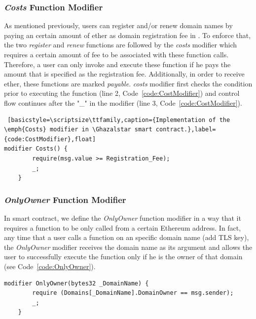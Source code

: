 \subsubsection*{\emph{Costs} Function Modifier}

As mentioned previously, users can register and/or renew domain names by paying an certain amount of ether as domain registration fee in \Ghazalstar. To enforce that, the two \emph{register} and \emph{renew} functions are followed by the \emph{costs} modifier which requires a certain amount of fee to be associated with these function calls. Therefore, a user can only invoke and execute these function if he pays the amount that is specified as the registration fee. Additionally, in order to receive ether, these functions are marked \emph{payable}. \emph{costs} modifier first checks the condition prior to executing the function (line 2, Code~\ref{code:CostModifier}) and control flow continues after the "\_" in the modifier (line 3, Code~\ref{code:CostModifier}).

\begin{lstlisting} [basicstyle=\scriptsize\ttfamily,caption={Implementation of the \emph{Costs} modifier in \Ghazalstar smart contract.},label={code:CostModifier},float]
modifier Costs() {
        require(msg.value >= Registration_Fee); 
        _;   
    }
\end{lstlisting}
\subsubsection*{\emph{OnlyOwner} Function Modifier}

In \Ghazalstar smart contract, we define the \emph{OnlyOwner} function modifier in a way that it requires a function to be only called from a certain Ethereum address. In fact, any time that a user calls a function on an specific domain name (\eg add TLS key), the \emph{OnlyOwner} modifier receives the domain name as its argument and allows the user to successfully execute the function only if he is the owner of that domain (see Code~\ref{code:OnlyOwner}). 

\begin{lstlisting}[basicstyle=\scriptsize\ttfamily,caption={Implementation of the \emph{OnlyOwner} modifier in \Ghazalstar smart contract.},label={code:OnlyOwner},float]
modifier OnlyOwner(bytes32 _DomainName) {
        require (Domains[_DomainName].DomainOwner == msg.sender);
        _;
    }
\end{lstlisting}
